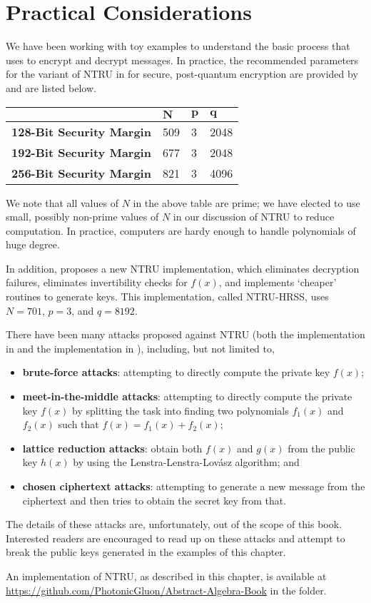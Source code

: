\section{Practical Considerations}
We have been working with toy examples to understand the basic process that \cite{hoffstein_pipher_silverman_1998} uses to encrypt and decrypt messages. In practice, the recommended parameters for the variant of NTRU in \cite{hoffstein_pipher_silverman_1998} for secure, post-quantum encryption are provided by \cite{ntru_2020} and are listed below.
\begin{table}[H]
    \centering
    \begin{tabular}{|l|l|l|l|}
        \hline
        & $\boldsymbol{N}$ & $\boldsymbol{p}$ & $\boldsymbol{q}$ \\ \hline
        \textbf{128-Bit Security Margin} & 509 & 3 & 2048 \\ \hline
        \textbf{192-Bit Security Margin} & 677 & 3 & 2048 \\ \hline
        \textbf{256-Bit Security Margin} & 821 & 3 & 4096 \\ \hline
    \end{tabular}
\end{table}

We note that all values of $N$ in the above table are prime; we have elected to use small, possibly non-prime values of $N$ in our discussion of NTRU to reduce computation. In practice, computers are hardy enough to handle polynomials of huge degree.

In addition, \cite{hulsing_rijneveld_schanck_schwabe_2018} proposes a new NTRU implementation, which eliminates decryption failures, eliminates invertibility checks for $f(x)$, and implements `cheaper' routines to generate keys. This implementation, called NTRU-HRSS, uses $N = 701$, $p = 3$, and $q = 8192$.

There have been many attacks proposed against NTRU (both the implementation in \cite{hoffstein_pipher_silverman_1996} and the implementation in \cite{hulsing_rijneveld_schanck_schwabe_2018}), including, but not limited to,
\begin{itemize}
    \item \textbf{brute-force attacks}: attempting to directly compute the private key $f(x)$;
    \item \textbf{meet-in-the-middle attacks}: attempting to directly compute the private key $f(x)$ by splitting the task into finding two polynomials $f_1(x)$ and $f_2(x)$ such that $f(x) = f_1(x) + f_2(x)$;
    \item \textbf{lattice reduction attacks}: obtain both $f(x)$ and $g(x)$ from the public key $h(x)$ by using the Lenstra-Lenstra-Lov\'asz algorithm; and
    \item \textbf{chosen ciphertext attacks}: attempting to generate a new message from the ciphertext and then tries to obtain the secret key from that.
\end{itemize}
The details of these attacks are, unfortunately, out of the scope of this book. Interested readers are encouraged to read up on these attacks and attempt to break the public keys generated in the examples of this chapter.

An implementation of NTRU, as described in this chapter, is available at \url{https://github.com/PhotonicGluon/Abstract-Algebra-Book} in the  folder.
